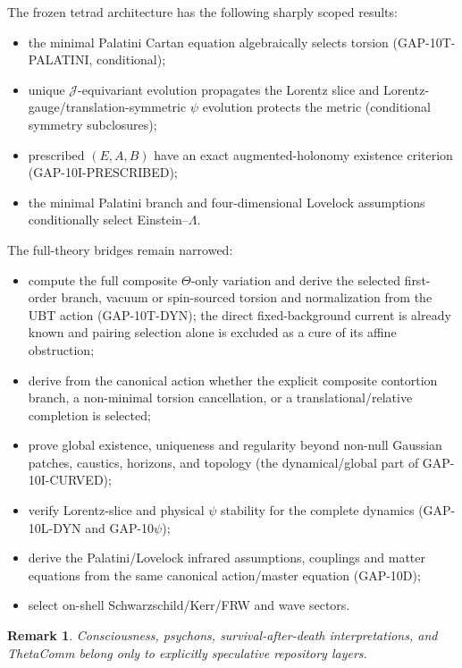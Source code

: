 \documentclass[11pt,a4paper]{article}
\newtheorem{remark}{Remark}
\begin{document}
The frozen tetrad architecture has the following sharply scoped results:
\begin{itemize}
 \item the minimal Palatini Cartan equation algebraically selects torsion
       (GAP-10T-PALATINI, conditional);
 \item unique $\mathcal J$-equivariant evolution propagates the Lorentz slice
       and Lorentz-gauge/translation-symmetric $\psi$ evolution protects the
       metric (conditional symmetry subclosures);
 \item prescribed $(E,A,B)$ have an exact augmented-holonomy existence
       criterion (GAP-10I-PRESCRIBED);
 \item the minimal Palatini branch and four-dimensional Lovelock assumptions
       conditionally select Einstein--$\Lambda$.
\end{itemize}
The full-theory bridges remain narrowed:
\begin{itemize}
 \item compute the full composite $\Theta$-only variation and derive the
       selected first-order branch, vacuum or spin-sourced torsion and
       normalization from the UBT action (GAP-10T-DYN); the direct
       fixed-background current is already known and pairing selection alone
       is excluded as a cure of its affine obstruction;
 \item derive from the canonical action whether the explicit composite
       contortion branch, a non-minimal torsion cancellation, or a
       translational/relative completion is selected;
 \item prove global existence, uniqueness and regularity beyond non-null
       Gaussian patches, caustics, horizons, and topology
       (the dynamical/global part of GAP-10I-CURVED);
 \item verify Lorentz-slice and physical $\psi$ stability for the complete
       dynamics (GAP-10L-DYN and GAP-10$\psi$);
 \item derive the Palatini/Lovelock infrared assumptions, couplings and matter
       equations from the same canonical action/master equation (GAP-10D);
 \item select on-shell Schwarzschild/Kerr/FRW and wave sectors.
\end{itemize}

\begin{remark}
Consciousness, psychons, survival-after-death interpretations, and ThetaComm
belong only to explicitly speculative repository layers.
\end{remark}
\end{document}
